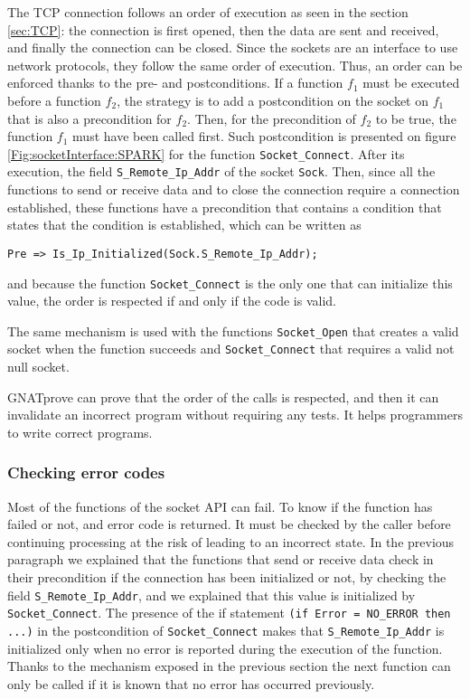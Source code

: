 \documentclass[runningheads]{llncs}
\let\Spark\lstinline
\begin{document}
    The TCP connection follows an order of execution as seen in the section \ref{sec:TCP}: the connection is first opened,
    then the data are sent and received, and finally the connection can be closed. Since the sockets are an interface to use
    network protocols, they follow the same order of execution. Thus, an order can be enforced thanks to the pre- and postconditions.
    If a function $f_1$ must be executed before a function $f_2$, the strategy is to add a postcondition on the socket on $f_1$
    that is also a precondition for $f_2$. Then, for the precondition of $f_2$ to be true, the function $f_1$ must have been called first.
    Such postcondition is presented on figure \ref{Fig:socketInterface:SPARK} for the function \Spark{Socket_Connect}. After its
    execution, the field \Spark{S_Remote_Ip_Addr} of the socket \Spark{Sock}. Then, since all the functions to send or receive
    data and to close the connection require a connection established, these functions have a precondition that contains a condition
    that states that the condition is established, which can be written as
    \begin{lstlisting}[style=Spark]
    Pre => Is_Ip_Initialized(Sock.S_Remote_Ip_Addr);
    \end{lstlisting}
    and because the function \Spark{Socket_Connect} is the only one that can initialize this value, the order is respected
    if and only if the code is valid.

    The same mechanism is used with the functions \Spark{Socket_Open} that creates a valid socket when the function
    succeeds and \Spark{Socket_Connect} that requires a valid not null socket.

    GNATprove can prove that the order of the calls is respected, and then it can invalidate an incorrect program without requiring any
    tests. It helps programmers to write correct programs.


\subsubsection{Checking error codes}

    Most of the functions of the socket API can fail. To know if the function has failed or not, and error code is returned.
    It must be checked by the caller before continuing processing at the risk of leading to an incorrect state.
    In the previous paragraph we explained that the functions that send or receive data check in their precondition if the connection
    has been initialized or not, by checking the field \Spark{S_Remote_Ip_Addr}, and we explained that this value is initialized
    by \Spark{Socket_Connect}. The presence of the if statement \Spark{(if Error = NO_ERROR then ...)} in the postcondition
    of \Spark{Socket_Connect}  makes that \Spark{S_Remote_Ip_Addr} is initialized only when no error is reported during
    the execution of the function. Thanks to the mechanism exposed in the previous section the next function can only be called
    if it is known that no error has occurred previously.
\end{document}
